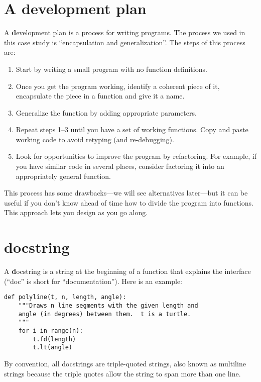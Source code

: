 \documentclass[
DIV=11,
fontsize=12,
twoside,
headinclude=false,
titlepage=firstiscover,
abstract=true,
headsepline=true,
footsepline=true,
chapterprefix=true, %
headings=big,
bibliography=totoc,%
captions=tableheading
]{scrbook}
\theoremstyle{definition}
\begin{document}
\section{A development plan}

A {\textbf development plan} is a process for writing programs.  The
process we used in this case study is ``encapsulation and
generalization''.  The steps of this process are:

\begin{enumerate}

\item Start by writing a small program with no function definitions.

\item Once you get the program working, identify a coherent piece of
  it, encapsulate the piece in a function and give it a name.

\item Generalize the function by adding appropriate parameters.

\item Repeat steps 1--3 until you have a set of working functions.
Copy and paste working code to avoid retyping (and re-debugging).

\item Look for opportunities to improve the program by refactoring.
For example, if you have similar code in several places, consider
factoring it into an appropriately general function.

\end{enumerate}

This process has some drawbacks---we will see alternatives later---but
it can be useful if you don't know ahead of time how to divide the
program into functions.  This approach lets you design as you go
along.


\section{docstring}
\label{docstring}

A {\textbf docstring} is a string at the beginning of a function that
explains the interface (``doc'' is short for ``documentation'').  Here
is an example:

\begin{lstlisting}
def polyline(t, n, length, angle):
    """Draws n line segments with the given length and
    angle (in degrees) between them.  t is a turtle.
    """    
    for i in range(n):
        t.fd(length)
        t.lt(angle)
\end{lstlisting}
%
By convention, all docstrings are triple-quoted strings, also known
as multiline strings because the triple quotes allow the string
to span more than one line.
\end{document}
